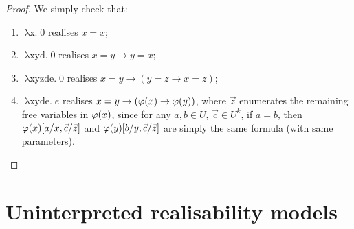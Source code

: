 \documentclass[12pt,openany]{book}
\theoremstyle{plain}
\theoremstyle{definition}
\newcommand\uplabel[1]{\textup{(#1)}}
\newcommand\oplam[1]{\mathop{\lambda #1.}}
\begin{document}
\begin{proof}
  We simply check that:
  \begin{enumerate}[label=\uplabel{E\arabic*}]
    \item $\oplam{x} 0$ realises $x = x$;
    \item $\oplam{xyd} 0$ realises $x = y \rightarrow y = x$;
    \item $\oplam{xyzde} 0$ realises $x = y \rightarrow \left(y = z \rightarrow x = z\right)$;
    \item $\oplam{xy\vec{z}de} e$ realises $x = y \rightarrow \left(\varphi\mleft(x\mright) \rightarrow \varphi\mleft(y\mright)\right)$, where $\vec{z}$ enumerates the remaining free variables in $\varphi\mleft(x\mright)$, since for any $a, b \in U$, $\vec{c} \in U^k$, if $a = b$, then $\varphi\mleft(x\mright)\mleft[a/x, \vec{c}/\vec{z}\mright]$ and $\varphi\mleft(y\mright)\mleft[b/y, \vec{c}/\vec{z}\mright]$ are simply the same formula (with same parameters). \qedhere
  \end{enumerate}
\end{proof}

\section{Uninterpreted realisability models}
\label{sec:uninterp-real}
\end{document}
